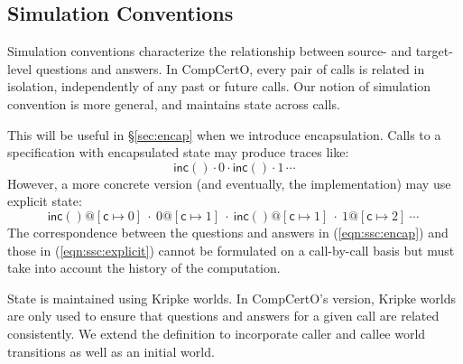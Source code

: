 \documentclass[acmsmall,screen,review,anonymous]{acmart}
\newcommand{\kw}[1]{\ensuremath{ \mathsf{#1} }}
\begin{document}
\subsection{Simulation Conventions} %

Simulation conventions
characterize the relationship between
source- and target-level
questions and answers.
In CompCertO,
every pair of calls is related in isolation,
independently of any past or future calls.
Our notion of simulation convention
is more general,
and maintains state across calls.

\begin{remark} \label{rem:base:ssc} %
This will be useful in \S\ref{sec:encap}
when we introduce encapsulation.
Calls to a specification with encapsulated state
may produce traces like:
\begin{equation} \label{eqn:ssc:encap}
  \kw{inc}() \cdot 0 \cdot \kw{inc}() \cdot 1 \,\cdots {}
\end{equation}
However, a more concrete version (and eventually, the implementation)
may use explicit state:
\begin{equation} \label{eqn:ssc:explicit}
  \kw{inc}()@[\kw{c} \mapsto 0] \:\cdot\:
  0@[\kw{c} \mapsto 1] \:\cdot\:
  \kw{inc}()@[\kw{c} \mapsto 1] \:\cdot\:
  1@[\kw{c} \mapsto 2] \:\cdots\: {}
\end{equation}
The correspondence between
the questions and answers in (\ref{eqn:ssc:encap})
and those in (\ref{eqn:ssc:explicit})
cannot be formulated on a call-by-call basis
but must take into account the history of the computation.
\end{remark}

State is maintained using Kripke worlds.
In CompCertO's version,
Kripke worlds are only used to ensure that
questions and answers for a given call
are related consistently.
We extend the definition to incorporate
caller and callee world transitions
as well as an initial world.
\end{document}
